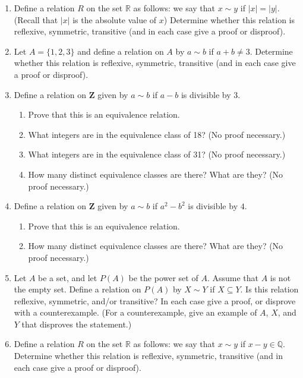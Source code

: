 \begin{enumerate}
\item Define a relation $R$ on the set $\mathbb{R}$ as follows: we say that $x \sim y$ if $|x| = |y|$. (Recall that $|x|$ is the absolute value of $x$) Determine whether this relation is reflexive, symmetric, transitive (and in each case give a proof or disproof).

\item Let $A = \{1,2,3\}$ and define a relation on $A$ by $a \sim b$ if $a + b \neq 3$. Determine whether this relation is reflexive, symmetric, transitive (and in each case give a proof or disproof).

\item Define a relation on $\mathbf{Z}$ given by $a \sim b$ if $a-b$ is divisible by $3$.
 \begin{enumerate}
 \item Prove that this is an equivalence relation.
 \item What integers are in the equivalence class of 18? (No proof necessary.)
 \item What integers are in the equivalence class of 31? (No proof necessary.) 
 \item How many distinct equivalence classes are there? What are they? (No proof necessary.)
 \end{enumerate}
\item Define a relation on $\mathbf{Z}$ given by $a \sim b$ if $a^2-b^2$ is divisible by $4$.
 \begin{enumerate}
 \item Prove that this is an equivalence relation.
 \item How many distinct equivalence classes are there? What are they? (No proof necessary.)
 \end{enumerate} 
\item Let $A$ be a set, and let $P(A)$ be the power set of $A$. Assume that $A$ is not the empty set. Define a relation on $P(A)$ by $X \sim Y$ if $X \subseteq Y$. Is this relation reflexive, symmetric, and/or transitive? In each case give a proof, or disprove with a counterexample. (For a counterexample, give an example of $A$, $X$, and $Y$ that disproves the statement.)

\item Define a relation $R$ on the set $\mathbb{R}$ as follows: we say that $x \sim y$ if $x - y \in \mathbb{Q}$. Determine whether this relation is reflexive, symmetric, transitive (and in each case give a proof or disproof).
  

\end{enumerate}

